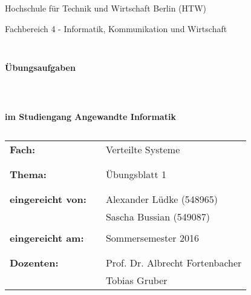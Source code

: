 \documentclass[a4paper]{scrartcl}
\begin{document}
\thispagestyle{empty}

%
%

\thispagestyle{empty}
\begin{center}
\Large{Hochschule für Technik und Wirtschaft Berlin (HTW)}\\
\end{center}
 
 
\begin{center}
\Large{Fachbereich 4 - Informatik, Kommunikation und Wirtschaft}
\end{center}
\begin{verbatim}


\end{verbatim}
\begin{center}
\textbf{\LARGE{Übungsaufgaben}}
\end{center}
\begin{verbatim}
 
 
\end{verbatim}
\begin{center}
\textbf{im Studiengang Angewandte Informatik}
\end{center}
\begin{verbatim}
\end{verbatim}
 
\begin{flushleft}
\begin{tabular}{lll}
\textbf{Fach:} & & Verteilte Systeme\\
& & \\
& & \\
\textbf{Thema:} & & Übungsblatt 1\\
& & \\
& & \\
\textbf{eingereicht von:} & & Alexander Lüdke (548965)\\
& & Sascha Bussian (549087)\\
& & \\
\textbf{eingereicht am:} & & Sommersemester 2016 \\
& & \\
& & \\
\textbf{Dozenten:} & & Prof. Dr. Albrecht Fortenbacher\\
& & Tobias Gruber \\
\end{tabular}
\end{flushleft}
\end{document}
